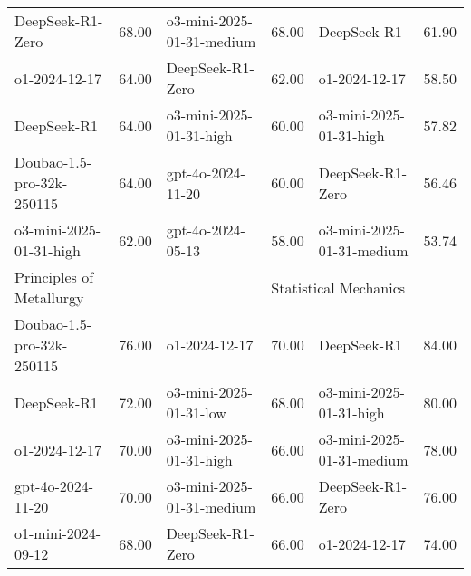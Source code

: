 {\begin{longtable}{p{4.2cm}>{\centering\arraybackslash} p{0.8cm}|p{4.2cm} >{\centering\arraybackslash} p{0.8cm}|p{4.2cm} >{\centering\arraybackslash} p{0.8cm}}
\hline
\cellcolor{blue!5} DeepSeek-R1-Zero & \cellcolor{blue!2}68.00 & \cellcolor{yellow!5} o3-mini-2025-01-31-medium & \cellcolor{yellow!2} 68.00 & \cellcolor{green!5} DeepSeek-R1 & \cellcolor{green!2} 61.90\\
\cellcolor{blue!5} o1-2024-12-17 & \cellcolor{blue!2}64.00 & \cellcolor{yellow!5} DeepSeek-R1-Zero & \cellcolor{yellow!2} 62.00 & \cellcolor{green!5} o1-2024-12-17 & \cellcolor{green!2} 58.50\\
\cellcolor{blue!5} DeepSeek-R1 & \cellcolor{blue!2}64.00 & \cellcolor{yellow!5} o3-mini-2025-01-31-high & \cellcolor{yellow!2} 60.00 & \cellcolor{green!5} o3-mini-2025-01-31-high & \cellcolor{green!2} 57.82\\
\cellcolor{blue!5} Doubao-1.5-pro-32k-250115 & \cellcolor{blue!2}64.00 & \cellcolor{yellow!5} gpt-4o-2024-11-20 & \cellcolor{yellow!2} 60.00 & \cellcolor{green!5} DeepSeek-R1-Zero & \cellcolor{green!2} 56.46\\
\cellcolor{blue!5} o3-mini-2025-01-31-high & \cellcolor{blue!2}62.00 & \cellcolor{yellow!5} gpt-4o-2024-05-13 & \cellcolor{yellow!2} 58.00 & \cellcolor{green!5} o3-mini-2025-01-31-medium & \cellcolor{green!2} 53.74\\
\hline
\multicolumn{2}{p{5.15cm}|}{\cellcolor{blue!10} \centering Principles of Metallurgy} & \multicolumn{2}{p{5.15cm}|}{\cellcolor{yellow!10} \centering Otorhinolaryngology} & \multicolumn{2}{p{5.15cm}}{\cellcolor{green!10} \centering Statistical Mechanics}\\
\hline
\cellcolor{blue!5} Doubao-1.5-pro-32k-250115 & \cellcolor{blue!2}76.00 & \cellcolor{yellow!5} o1-2024-12-17 & \cellcolor{yellow!2} 70.00 & \cellcolor{green!5} DeepSeek-R1 & \cellcolor{green!2} 84.00\\
\cellcolor{blue!5} DeepSeek-R1 & \cellcolor{blue!2}72.00 & \cellcolor{yellow!5} o3-mini-2025-01-31-low & \cellcolor{yellow!2} 68.00 & \cellcolor{green!5} o3-mini-2025-01-31-high & \cellcolor{green!2} 80.00\\
\cellcolor{blue!5} o1-2024-12-17 & \cellcolor{blue!2}70.00 & \cellcolor{yellow!5} o3-mini-2025-01-31-high & \cellcolor{yellow!2} 66.00 & \cellcolor{green!5} o3-mini-2025-01-31-medium & \cellcolor{green!2} 78.00\\
\cellcolor{blue!5} gpt-4o-2024-11-20 & \cellcolor{blue!2}70.00 & \cellcolor{yellow!5} o3-mini-2025-01-31-medium & \cellcolor{yellow!2} 66.00 & \cellcolor{green!5} DeepSeek-R1-Zero & \cellcolor{green!2} 76.00\\
\cellcolor{blue!5} o1-mini-2024-09-12 & \cellcolor{blue!2}68.00 & \cellcolor{yellow!5} DeepSeek-R1-Zero & \cellcolor{yellow!2} 66.00 & \cellcolor{green!5} o1-2024-12-17 & \cellcolor{green!2} 74.00\\

\end{longtable}}
